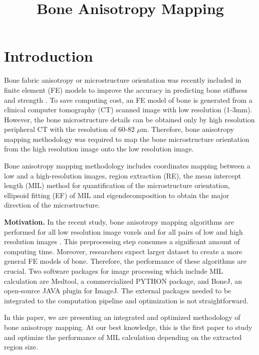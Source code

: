 \documentclass[letterpaper]{article}
\title{Bone Anisotropy Mapping}
\newcommand{\mypar}[1]{{\bf #1.}}
\begin{document}
%
\maketitle
%

\begin{abstract}
\color{red}{Todo}
\end{abstract}

\section{Introduction}\label{sec:intro}

Bone fabric anisotropy or microstructure orientation was recently included in finite element (FE) models to improve the accuracy in predicting bone stiffness and strength \cite{Panyasantisuk:18}. To save computing cost, an FE model of bone is generated from a clinical computer tomography (CT) scanned image with low resolution (1-3mm). However, the bone microstructure details can be obtained only by high resolution peripheral CT with the resolution of 60-82 $\mu$m. Therefore, bone anisotropy mapping methodology was required to map the bone microstructure orientation from the high resolution image onto the low resolution image.

Bone anisotropy mapping methodology includes coordinates mapping between a low and a high-resolution images, region extraction (RE), the mean intercept length (MIL) method for quantification of the microstructure orientation, ellipsoid fitting (EF) of MIL and eigendecomposition to obtain the major direction of the microstructure.

\mypar{Motivation} In the recent study, bone anisotropy mapping algorithms are performed for all low resolution image voxels and for all pairs of low and high resolution images \cite{Panyasantisuk:18}. This preprocessing step consumes a significant amount of computing time. Moreover, researchers expect larger dataset to create a more general FE models of bone. Therefore, the performance of these algorithms are crucial. Two software packages for image processing which include MIL calculation are Medtool, a commercialized PYTHON package, and BoneJ, an open-source JAVA plugin for ImageJ. The external packages needed to be integrated to the computation pipeline and optimization is not straightforward. 

In this paper, we are presenting an integrated and optimized methodology of bone anisotropy mapping. At our best knowledge, this is the first paper to study and optimize the performance of MIL calculation depending on the extracted region size.
  
\end{document}
